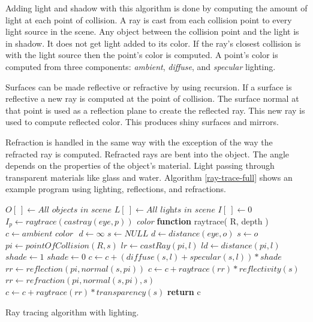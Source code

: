 \documentclass[11pt,a4paper,oneside]{article}
\begin{document}
Adding light and shadow with this algorithm is done by computing the amount of light at each point of collision.  A ray is cast from each collision point to every light source in the scene.  Any object between the collision point and the light is in shadow.   It does not get light added to its color. If the ray's closest collision is with the light source then the point's color is computed.  A point's color is computed from three components: \textit{ambient}, \textit{diffuse}, and \textit{specular} lighting\cite{kalinini:2008}.

Surfaces can be made reflective or refractive by using recursion.  If a surface is reflective a new ray is computed at the point of collision.   The surface normal at that point  is used as a reflection plane to create the reflected ray.  This new ray is used to compute reflected color.  This produces shiny surfaces and mirrors.  

Refraction is handled in the same way with the exception of the way the refracted ray is computed.  Refracted rays are bent into the object.  The angle depends on the properties of the object's material.  Light passing through transparent materials like glass and water. Algorithm \ref{ray-trace-full} shows an example program using lighting, reflections, and refractions.
  
\begin{algorithm}[H]
\begin{algorithmic}[1]
\STATE $O[\ ] \gets \textit{All objects in scene}$ 
\STATE $L[\ ] \gets \textit{All lights in scene}$
\STATE $I[\ ] \gets 0$ 
\STATE
{}
	\STATE $I_{p} \gets raytrace( castray( eye, p ))$
\ENDFOR
\STATE 
\STATE \textit{color} \textbf{function} raytrace(  R, depth )
	\STATE $c  \gets \textit{ambient color } $
	\STATE $d \gets \infty $
	\STATE $s \gets \textit{NULL}$
				\STATE $d \gets distance( \textit{eye}, o )$
				\STATE $s \gets o$
			\ENDIF
		\ENDIF
	\ENDFOR
		\STATE {}
		\STATE $pi \gets pointOfCollision( R, s )$
			\STATE $lr \gets castRay( pi, l )$
			\STATE $ld \gets distance( pi, l )$
			\STATE $shade \gets 1$
					\STATE $shade \gets 0$				
				\ENDIF
				\STATE $c \gets c +( diffuse( s, l ) + specular( s, l )) * shade$ 
			\ENDFOR
		\ENDFOR
		\STATE {}
			\STATE $rr \gets reflection( pi, normal( s, pi ))$
			\STATE $c \gets c + raytrace( rr ) * reflectivity( s )$
		\ENDIF
		\STATE {}
			\STATE $rr \gets refraction( pi, normal( s, pi ), s )$
			\STATE $c \gets c + raytrace( rr ) * transparency( s )$
		\ENDIF
	\ENDIF
	\STATE \textbf{return} c

\end{algorithmic}
\caption{ Ray tracing algorithm with lighting. }
\label{ray-trace-full}
\end{algorithm}
\newpage
\end{document}
